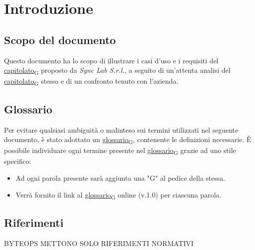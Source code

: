 \section{Introduzione}
\setcounter{subsection}{0}
\subsection{Scopo del documento}
Questo documento ha lo scopo di illustrare i casi d'uso e i requisiti del \href{https://7last.github.io/docs/rtb/documentazione-interna/glossario\#capitolato}{capitolato\textsubscript{G}} proposto da \textit{Sync Lab S.r.l.}, a seguito di un'attenta analisi del \href{https://7last.github.io/docs/rtb/documentazione-interna/glossario\#capitolato}{capitolato\textsubscript{G}} stesso e di un confronto tenuto con l'azienda.
\subsection{Glossario}
Per evitare qualsiasi ambiguità o malinteso sui termini utilizzati nel seguente documento, è stato adottato un \href{https://7last.github.io/docs/rtb/documentazione-interna/glossario\#glossario}{glossario\textsubscript{G}}, contenente le definizioni necessarie. È possibile individuare ogni termine presente nel \href{https://7last.github.io/docs/rtb/documentazione-interna/glossario\#glossario}{glossario\textsubscript{G}} grazie ad uno stile specifico:
\begin{itemize}
	\item Ad ogni parola presente sarà aggiunta una "G" al pedice della stessa.
	\item Verrà fornito il link al \href{https://7last.github.io/docs/rtb/documentazione-interna/glossario\#glossario}{glossario\textsubscript{G}} online (v.1.0) per ciascuna parola.
\end{itemize}

\subsection{Riferimenti} BYTEOPS METTONO SOLO RIFERIMENTI NORMATIVI
